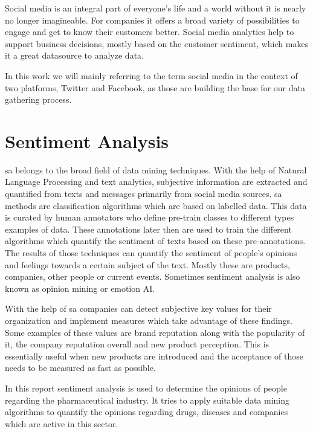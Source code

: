 \documentclass[11pt,titlepage,oneside,openany]{book}
\begin{document}
Social media is an integral part of everyone’s life and a world without it is nearly no longer imagineable. For companies it offers a broad variety of possibilities to engage and get to know their customers better. Social media analytics help to support business decisions, mostly based on the customer sentiment, which makes it a great datasource to analyze data. \cite{Rouse2016-09-15}
\par
In this work we will mainly referring to the term social media in the context of two platforms, Twitter and Facebook, as those are building the base for our data gathering process. 


\section{Sentiment Analysis}
\label{sec:sentana}

\acrfull{sa} belongs to the broad field of data mining techniques. With the help of Natural Language Processing and text analytics, subjective information are extracted and quantified from texts and messages primarily from social media sources. \acrshort{sa} methods are classification algorithms which are based on labelled data. This data is curated by human annotators who define pre-train classes to different types examples of data. These annotations later then are used to train the different algorithms which quantify the sentiment of texts based on these pre-annotations. The results of those techniques can quantify the sentiment of people's opinions and feelings towards a certain subject of the text. Mostly these are products, companies, other people or current events. Sometimes sentiment analysis is also known as opinion mining or emotion AI.

With the help of \acrlong{sa} companies can detect subjective key values for their organization and implement measures which take advantage of these findings. Some examples of these values are brand reputation along with the popularity of it, the company reputation overall and new product perception. This is essentially useful when new products are introduced and the acceptance of those needs to be measured as fast as possible. \cite{Techopedia2014-01-21}

In this report sentiment analysis is used to determine the opinions of people regarding the pharmaceutical industry. It tries to apply suitable data mining algorithms to quantify the opinions regarding drugs, diseases and companies which are active in this sector.
\end{document}

